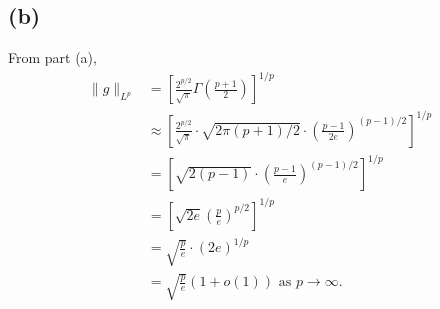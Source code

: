 \subsection*{(b)}
From part (a), 
\begin{align*}
	\lVert g \rVert_{L^p} 
	&= \left[ \frac{2^{p/2}}{\sqrt{\pi}} \Gamma \left( \frac{p + 1}{2} \right) \right]^{1/p} \\
	&\approx \left[ \frac{2^{p/2}}{\sqrt{\pi}} \cdot \sqrt{2 \pi(p + 1) / 2} \cdot 
	\left( \frac{p - 1}{2e} \right)^{(p - 1)/2} \right]^{1/p} \\
	&= \left[ \sqrt{2(p - 1)} \cdot \left( \frac{p - 1}{e} \right)^{(p-1)/2} \right]^{1/p} \\
	&= \left[ \sqrt{2e} \left( \frac{p}{e} \right)^{p/2} \right]^{1/p} \\
	&= \sqrt{\frac{p}{e}} \cdot (2e)^{1/p} \\
	&= \sqrt{\frac{p}{e}} (1 + o(1)) \text{ as } p \to \infty.
\end{align*}


